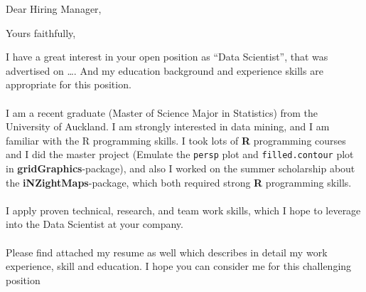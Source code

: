 \documentclass[12pt,a4paper,sans]{moderncv}        %
\title{}                               %
\begin{document}
	\date{19/07/2017}
	\opening{Dear Hiring Manager,}
	\closing{Yours faithfully,}
	\makelettertitle
	
	I have a great interest in your open position as “Data Scientist”, that was advertised on …. And my education background and experience skills are appropriate for this position. \\~\\
	
	I am a recent graduate (Master of Science Major in Statistics) from the University of Auckland. I am strongly interested in data mining, and I am familiar with the R programming skills. I took lots of \textbf{R} programming courses and I did the master project (Emulate the \texttt{persp} plot and \texttt{filled.contour} plot in  \textbf{gridGraphics}-package), and also I worked on the summer scholarship about the \textbf{iNZightMaps}-package, which both required strong \textbf{R} programming skills. 
	\\~\\
	I apply proven technical, research, and team work skills, which I hope to leverage into the Data Scientist at your company. \\~\\
	
	Please find attached my resume as well which describes in detail my work experience, skill and education. I hope you can consider me for this challenging position
	
	
	\makeletterclosing
	
\end{document}
